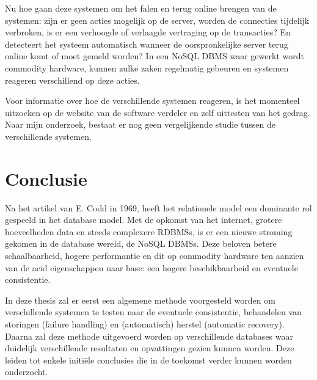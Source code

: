 Nu hoe gaan deze systemen om het falen en terug online brengen van de systemen: zijn er geen acties mogelijk op de server, worden de connecties tijdelijk verbroken, is er een verhoogde of verlaagde vertraging op de transacties? En detecteert het systeem automatisch wanneer de oorspronkelijke server terug online komt of moet gemeld worden? In een NoSQL \gls{DBMS} waar gewerkt wordt commodity hardware, kunnen zulke zaken regelmatig gebeuren en systemen reageren verschillend op deze acties. 

Voor informatie over hoe de verschillende systemen reageren, is het momenteel uitzoeken op de website van de software verdeler en zelf uittesten van het gedrag. Naar mijn onderzoek, bestaat er nog geen vergelijkende studie tussen de verschillende systemen. 

\section{Conclusie}
Na het artikel van E. Codd \cite{Codd:1970:RMD:362384.362685} in 1969, heeft het relationele model een dominante rol gespeeld in het database model. Met de opkomst van het internet, grotere hoeveelheden data en steeds complexere R\glspl{DBMS}, is er een nieuwe stroming gekomen in de database wereld, de NoSQL \glspl{DBMS}. Deze beloven betere schaalbaarheid, hogere performantie en dit op commodity hardware ten aanzien van de \gls{acid} eigenschappen naar \gls{base}: een hogere beschikbaarheid en eventuele consistentie.  

In deze thesis zal er eerst een algemene methode voorgesteld worden om verschillende systemen te testen naar de eventuele consistentie, behandelen van storingen (failure handling) en (automatisch) herstel (automatic recovery).  \\
Daarna zal deze methode uitgevoerd worden op verschillende databases waar duidelijk verschillende resultaten en opvattingen gezien kunnen worden. Deze leiden tot enkele initiële conclusies die in de toekomst verder kunnen worden onderzocht. 